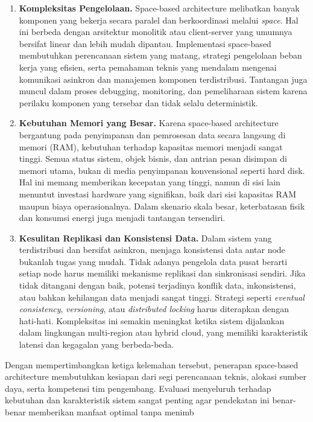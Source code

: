 \begin{enumerate}
	\item \textbf{Kompleksitas Pengelolaan.}  
	Space-based architecture melibatkan banyak komponen yang bekerja secara paralel dan berkoordinasi melalui \textit{space}. Hal ini berbeda dengan arsitektur monolitik atau client-server yang umumnya bersifat linear dan lebih mudah dipantau. Implementasi space-based membutuhkan perencanaan sistem yang matang, strategi pengelolaan beban kerja yang efisien, serta pemahaman teknis yang mendalam mengenai komunikasi asinkron dan manajemen komponen terdistribusi. Tantangan juga muncul dalam proses debugging, monitoring, dan pemeliharaan sistem karena perilaku komponen yang tersebar dan tidak selalu deterministik.
	
	\item \textbf{Kebutuhan Memori yang Besar.}  
	Karena space-based architecture bergantung pada penyimpanan dan pemrosesan data secara langsung di memori (RAM), kebutuhan terhadap kapasitas memori menjadi sangat tinggi. Semua status sistem, objek bisnis, dan antrian pesan disimpan di memori utama, bukan di media penyimpanan konvensional seperti hard disk. Hal ini memang memberikan kecepatan yang tinggi, namun di sisi lain menuntut investasi hardware yang signifikan, baik dari sisi kapasitas RAM maupun biaya operasionalnya. Dalam skenario skala besar, keterbatasan fisik dan konsumsi energi juga menjadi tantangan tersendiri.
	
	\item \textbf{Kesulitan Replikasi dan Konsistensi Data.}  
	Dalam sistem yang terdistribusi dan bersifat asinkron, menjaga konsistensi data antar node bukanlah tugas yang mudah. Tidak adanya pengelola data pusat berarti setiap node harus memiliki mekanisme replikasi dan sinkronisasi sendiri. Jika tidak ditangani dengan baik, potensi terjadinya konflik data, inkonsistensi, atau bahkan kehilangan data menjadi sangat tinggi. Strategi seperti \textit{eventual consistency}, \textit{versioning}, atau \textit{distributed locking} harus diterapkan dengan hati-hati. Kompleksitas ini semakin meningkat ketika sistem dijalankan dalam lingkungan multi-region atau hybrid cloud, yang memiliki karakteristik latensi dan kegagalan yang berbeda-beda.
\end{enumerate}

Dengan mempertimbangkan ketiga kelemahan tersebut, penerapan space-based architecture membutuhkan kesiapan dari segi perencanaan teknis, alokasi sumber daya, serta kompetensi tim pengembang. Evaluasi menyeluruh terhadap kebutuhan dan karakteristik sistem sangat penting agar pendekatan ini benar-benar memberikan manfaat optimal tanpa menimb


